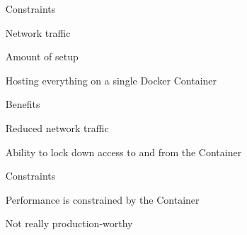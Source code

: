 \begin{DoxyItemize}
\item ~ Constraints
\item ~ Network traffic
\item ~ Amount of setup
\item ~ Hosting everything on a single Docker Container
\item ~ Benefits
\item ~ Reduced network traffic
\item ~ Ability to lock down access to and from the Container
\item ~ Constraints
\item ~ Performance is constrained by the Container
\item ~ Not really production-\/worthy 
\end{DoxyItemize}
